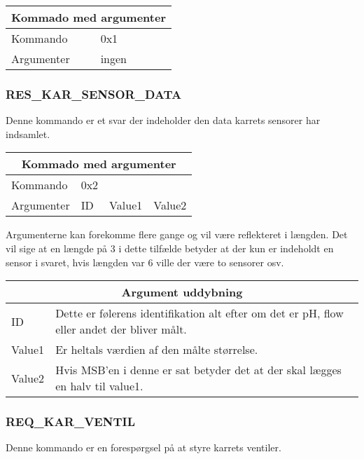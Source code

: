 \begin{table}[H]
\setlength{\parindent}{12pt}
\begin{tabular}{|l|lcc|}
\hline
\multicolumn{4}{|c|}{Kommado med argumenter}\\\hline
Kommando & 0x1 & & \\
Argumenter & ingen & & \\\hline
\end{tabular}
\end{table}



\subsubsection{RES\_KAR\_SENSOR\_DATA}
Denne kommando er et svar der indeholder den data karrets sensorer har indsamlet.

\begin{table}[H]
\setlength{\parindent}{12pt}
\begin{tabular}{|l|lcc|}
\hline
\multicolumn{4}{|c|}{Kommado med argumenter}\\\hline
Kommando & 0x2 & & \\
Argumenter & ID & Value1 & Value2 \\\hline
\end{tabular}
\end{table}

Argumenterne kan forekomme flere gange og vil være reflekteret i længden. Det vil sige at en længde på 3 i dette tilfælde betyder at der kun er indeholdt en sensor i svaret, hvis længden var 6 ville der være to sensorer osv.

\begin{table}[H]
\setlength{\parindent}{12pt}
\begin{tabular}{|l|l|}
\hline
\multicolumn{2}{|c|}{Argument uddybning}\\\hline
ID & Dette er følerens identifikation alt efter om det er pH, flow eller andet der bliver målt. \\
Value1 & Er heltals værdien af den målte størrelse. \\
Value2 & Hvis MSB'en i denne er sat betyder det at der skal lægges en halv til value1.\\\hline
\end{tabular}
\end{table}


\subsubsection{REQ\_KAR\_VENTIL}
Denne kommando er en forespørgsel på at styre karrets ventiler.

